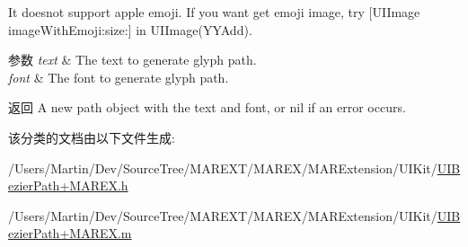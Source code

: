 It doesnot support apple emoji. If you want get emoji image, try \mbox{[}U\+I\+Image image\+With\+Emoji\+:size\+:\mbox{]} in {\ttfamily U\+I\+Image(\+Y\+Y\+Add)}.


\begin{DoxyParams}{参数}
{\em text} & The text to generate glyph path. \\
\hline
{\em font} & The font to generate glyph path.\\
\hline
\end{DoxyParams}
\begin{DoxyReturn}{返回}
A new path object with the text and font, or nil if an error occurs. 
\end{DoxyReturn}


该分类的文档由以下文件生成\+:\begin{DoxyCompactItemize}
\item 
/\+Users/\+Martin/\+Dev/\+Source\+Tree/\+M\+A\+R\+E\+X\+T/\+M\+A\+R\+E\+X/\+M\+A\+R\+Extension/\+U\+I\+Kit/\hyperlink{_u_i_bezier_path_09_m_a_r_e_x_8h}{U\+I\+Bezier\+Path+\+M\+A\+R\+E\+X.\+h}\item 
/\+Users/\+Martin/\+Dev/\+Source\+Tree/\+M\+A\+R\+E\+X\+T/\+M\+A\+R\+E\+X/\+M\+A\+R\+Extension/\+U\+I\+Kit/\hyperlink{_u_i_bezier_path_09_m_a_r_e_x_8m}{U\+I\+Bezier\+Path+\+M\+A\+R\+E\+X.\+m}\end{DoxyCompactItemize}
